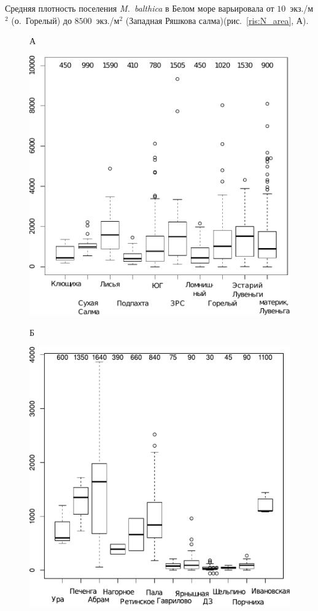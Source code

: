 {Средняя плотность поселения {\it M.~balthica} в Белом море варьировала от $10$~экз./м$^2$ (о.~Горелый) до $8500$~экз./м$^2$ (Западная Ряшкова салма)(рис.~\ref{ris:N_area}, А).
	\begin{figure}[ht]
	\begin{minipage}[]{.48\linewidth}
	{\small А}
	\begin{center}
		\includegraphics[width=\linewidth]{../All_N/N2_area_White1.pdf}
	\end{center}
	\end{minipage}
	\hfill
	\begin{minipage}[]{.48\linewidth}
	{\small Б}
	\begin{center}
		\includegraphics[width=\linewidth]{../All_N/N2_area_Barents1.pdf}

\end{center}
\end{minipage}
\end{figure}}
